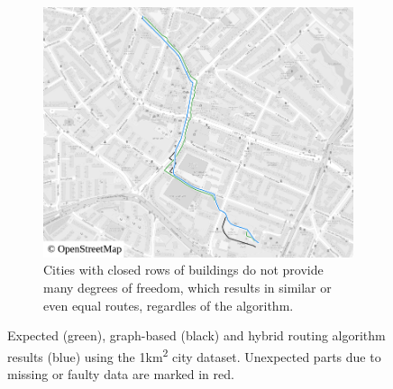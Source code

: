 \begin{figure}[h!]
\begin{minipage}[t]{.48\textwidth}
\begin{subfigure}[t]{\linewidth}
\begin{figcenter}
							\includegraphics[width=\textwidth]{images/qgis-routing-city-routing-18}
						\end{figcenter}
						\caption{Cities with closed rows of buildings do not provide many degrees of freedom, which results in similar or even equal routes, regardles of the algorithm.}
						\label{fig:eval-city-usefulness-d}
					\end{subfigure}
				\end{minipage}
				\caption{Expected (green), graph-based (black) and hybrid routing algorithm results (blue) using the 1km\textsuperscript{2} city dataset. Unexpected parts due to missing or faulty data are marked in red.}
				\label{fig:eval-city-usefulness}
			\end{figure}
			

